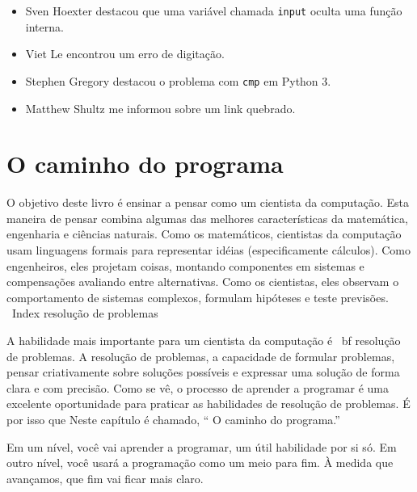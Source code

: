 \documentclass[10pt]{book}
\begin{document}
\begin {itemize}
\item Sven Hoexter destacou que uma variável chamada {\tt input}
oculta uma função interna. %

\item Viet Le encontrou um erro de digitação.

\item Stephen Gregory destacou o problema com {\tt cmp}
em Python 3.

\item Matthew Shultz me informou sobre um link quebrado.


\end{itemize}

\normalsize
\clearemptydoublepage

\begin{latexonly}

\tableofcontents

\clearemptydoublepage

\end {latexonly}

\mainmatter

\chapter{O caminho do programa}

O objetivo deste livro é ensinar a pensar como um
cientista da computação. Esta maneira de pensar combina algumas das melhores características
da matemática, engenharia e ciências naturais. Como os matemáticos,
cientistas da computação usam linguagens formais para representar idéias (especificamente
cálculos). Como engenheiros, eles projetam coisas, montando componentes
em sistemas e compensações avaliando entre alternativas. Como os cientistas,
eles observam o comportamento de sistemas complexos, formulam hipóteses e teste
previsões.
\ Index {} resolução de problemas

A habilidade mais importante para um cientista da computação é {\ bf
resolução de problemas}. A resolução de problemas, a capacidade de formular
problemas, pensar criativamente sobre soluções possíveis e expressar uma solução de forma clara
e com precisão. Como se vê, o processo de aprender a programar é uma
excelente oportunidade para praticar as habilidades de resolução de problemas. É por isso que
Neste capítulo é chamado, `` O caminho do programa.''

Em um nível, você vai aprender a programar, um útil
habilidade por si só. Em outro nível, você usará a programação como um meio para
fim. À medida que avançamos, que fim vai ficar mais claro.
\end{document}
